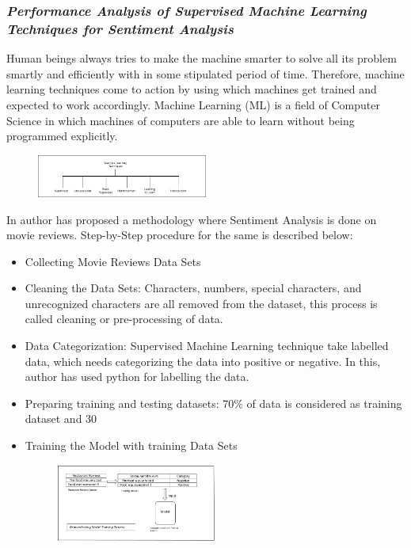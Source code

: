 \documentclass[conference]{IEEEtran}
\begin{document}
{\subsubsection{\textit{Performance Analysis of Supervised Machine Learning Techniques for Sentiment Analysis\cite{b10}}}
Human beings always tries to make the machine smarter to solve all its problem smartly and efficiently with in some stipulated period of time. Therefore, machine learning techniques come to action by using which machines get trained and expected to work accordingly. Machine Learning (ML) is a field of Computer Science in which machines of computers are able to learn without being programmed explicitly. \\
\begin{figure}[!ht]
	\centering
	\includegraphics[width=0.5\textwidth]{tech.png}
\end{figure}
In \cite{b10} author has proposed a methodology where Sentiment Analysis is done on movie reviews. Step-by-Step procedure for the same is described below:
\begin{itemize}
	\item Collecting Movie Reviews Data Sets
	\item Cleaning the Data Sets: Characters, numbers, special characters, and unrecognized characters are all removed from the dataset, this process is called cleaning or pre-processing of data.
	\item Data Categorization: Supervised Machine Learning technique take labelled data, which needs categorizing the data into positive or negative. In this, author has used python for labelling the data.
	\item Preparing training and testing datasets: 70\% of data is considered as training dataset and 30%
	\item Training the Model with training Data Sets
	\begin{figure}[!ht]
		\centering
		\includegraphics[width=0.5\textwidth]{train.png}

\end{figure}
\end{itemize}}
\end{document}
